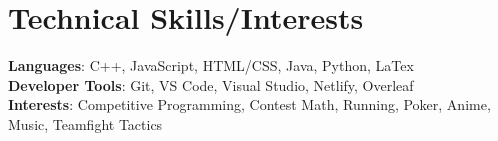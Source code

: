 \documentclass[letterpaper,11pt]{article}
\begin{document}
%
\section{Technical Skills/Interests}
 \begin{itemize}[leftmargin=0.15in, label={}]
    \small{\item{
     \textbf{Languages}{: C++, JavaScript, HTML/CSS, Java, Python, LaTex  } \\
     \textbf{Developer Tools}{: Git, VS Code, Visual Studio, Netlify, Overleaf} \\
    \textbf{Interests}{: Competitive Programming, Contest Math, Running, Poker, Anime, Music, Teamfight Tactics}
    }}
 \end{itemize}


\end{document}
